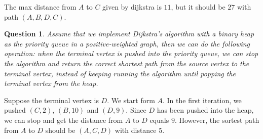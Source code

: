 \documentclass[10.5pt]{article}
\newtheorem{Q}{Question}
\begin{document}
The max distance from $A$ to $C$ given by dijkstra is $11$, but it should be $27$ with path $(A,B,D,C)$.
\begin{Q}
	Assume that we implement Dijkstra’s algorithm with a binary heap as the priority queue in a positive-weighted graph, then we can do the following operation: when the terminal vertex is pushed into the priority queue, we can stop the algorithm and return the correct shortest path from the source vertex to the terminal vertex, instead of keeping running the algorithm until popping the terminal vertex from the heap.
\end{Q}
\begin{center}
\end{center}
Suppose the terminal vertex is $D$. We start form $A$. In the first iteration, we pushed $(C, 2)$, $(B, 10)$ and $(D, 9)$. Since $D$ has been pushed into the heap, we can stop and get the distance from $A$ to $D$ equals $9$.
However, the sortest path from $A$ to $D$ should be $(A, C, D)$ with distance $5$.
\end{document}
